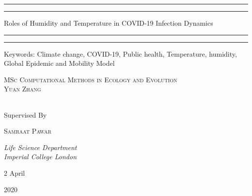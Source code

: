 \documentclass[11pt]{article}
\begin{document}
 
  	
	\begin{titlepage} %
		
		\centering %
		
		\scshape %
		
		\vspace*{\baselineskip} %
		
		
		\rule{\textwidth}{1.6pt}\vspace*{-\baselineskip}\vspace*{2pt} %
		\rule{\textwidth}{0.4pt} %
		
		\vspace{0.75\baselineskip} %
		
		{\LARGE Roles of Humidity and Temperature in COVID-19 Infection Dynamics \\} %
		
		\vspace{0.75\baselineskip} %
		
		\rule{\textwidth}{0.4pt}\vspace*{-\baselineskip}\vspace{3.2pt} %
		\rule{\textwidth}{1.6pt} %
		
		Keywords: Climate change, COVID-19, Public health, Temperature, humidity, Global Epidemic and Mobility Model
		
		\vspace{2\baselineskip} %
		
		{\scshape\Large MSc Computational Methods in Ecology and Evolution\\Yuan Zhang \\}\
		
		\vspace*{3\baselineskip} %
		
		
		Supervised By
		
		\vspace{0.5\baselineskip} %
		
		{\scshape\Large Samraat Pawar \\} %
		
		\vspace{0.5\baselineskip} 
		
		\textit{Life Science Department\\Imperial College London } %
		
		\vfill %
	
		\vspace{0.3\baselineskip} %
		
		2 April  
		
		{\large 2020} 
		
	\end{titlepage}
\end{document}
